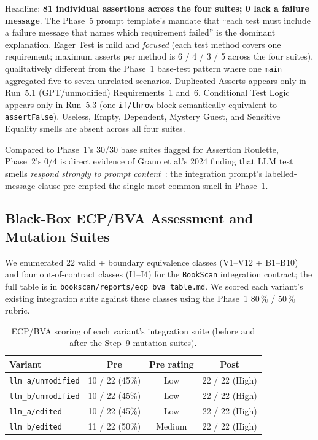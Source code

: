 \documentclass[journal]{IEEEtran}
\begin{document}
Headline: \textbf{81 individual assertions across the four
suites; 0 lack a failure message}. The Phase~5 prompt template's
mandate that ``each test must include a failure message that
names which requirement failed'' is the dominant explanation.
Eager Test is mild and \emph{focused} (each test method covers
one requirement; maximum asserts per method is 6 / 4 / 3 / 5
across the four suites), qualitatively different from the
Phase~1 base-test pattern where one \texttt{main} aggregated
five to seven unrelated scenarios. Duplicated Asserts appears
only in Run~5.1 (GPT/unmodified) Requirements~1 and~6.
Conditional Test Logic appears only in Run~5.3 (one
\texttt{if/throw} block semantically equivalent to
\texttt{assertFalse}). Useless, Empty, Dependent, Mystery
Guest, and Sensitive Equality smells are absent across all
four suites.

Compared to Phase~1's 30/30 base suites flagged for Assertion
Roulette, Phase~2's 0/4 is direct evidence of Grano et al.'s
2024 finding that LLM test smells \emph{respond strongly to
prompt content}~\cite{grano2024testsmells}: the integration
prompt's labelled-message clause pre-empted the single most
common smell in Phase~1.

\subsection{Black-Box ECP/BVA Assessment and Mutation Suites}
\label{sec:p2ecp}

We enumerated 22 valid + boundary equivalence classes (V1--V12
+ B1--B10) and four out-of-contract classes (I1--I4) for the
\texttt{BookScan} integration contract; the full table is in
\texttt{bookscan/reports/ecp\_bva\_table.md}. We scored each
variant's existing integration suite against these classes
using the Phase~1 80\,\% / 50\,\% rubric.

\begin{table}[!t]
\centering
\caption{ECP/BVA scoring of each variant's integration suite
(before and after the Step~9 mutation suites).}
\label{tab:p2ecp}
\renewcommand{\arraystretch}{1.15}
\begin{tabular}{@{}l c c c@{}}
\toprule
\textbf{Variant} & \textbf{Pre} & \textbf{Pre rating} & \textbf{Post} \\
\midrule
\texttt{llm\_a/unmodified} & 10 / 22 (45\%) & Low    & 22 / 22 (High) \\
\texttt{llm\_b/unmodified} & 10 / 22 (45\%) & Low    & 22 / 22 (High) \\
\texttt{llm\_a/edited}     & 10 / 22 (45\%) & Low    & 22 / 22 (High) \\
\texttt{llm\_b/edited}     & 11 / 22 (50\%) & Medium & 22 / 22 (High) \\
\bottomrule
\end{tabular}
\end{table}
\end{document}

